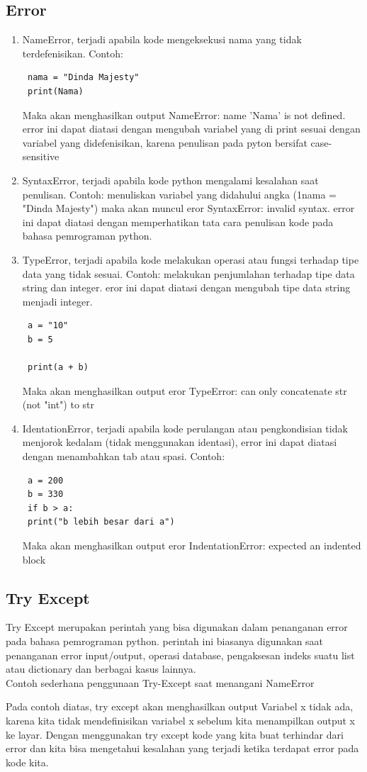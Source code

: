 \subsection{Error}
\begin{enumerate}
 \item NameError, terjadi apabila kode mengeksekusi nama yang tidak terdefenisikan. Contoh:
 \begin{verbatim}
 nama = "Dinda Majesty"
 print(Nama)
 \end{verbatim}
 Maka akan menghasilkan output NameError: name 'Nama' is not defined. error ini dapat diatasi dengan mengubah variabel yang di print sesuai dengan variabel yang didefenisikan, karena penulisan pada pyton bersifat case-sensitive
 
 \item SyntaxError, terjadi apabila kode python mengalami kesalahan saat penulisan. Contoh: menuliskan variabel yang didahului angka (1nama = "Dinda Majesty") maka akan muncul eror SyntaxError: invalid syntax. error ini dapat diatasi dengan memperhatikan tata cara penulisan kode pada bahasa pemrograman python.
 
 \item TypeError, terjadi apabila kode melakukan operasi atau fungsi terhadap tipe data yang tidak sesuai. Contoh: melakukan penjumlahan terhadap tipe data string dan integer. eror ini dapat diatasi dengan mengubah tipe data string menjadi integer.
 \begin{verbatim}
 a = "10"
 b = 5

 print(a + b)
 \end{verbatim}
 Maka akan menghasilkan output eror TypeError: can only concatenate str (not "int") to str
 
 \item IdentationError, terjadi apabila kode perulangan atau pengkondisian tidak menjorok kedalam (tidak menggunakan identasi), error ini dapat diatasi dengan menambahkan tab atau spasi. Contoh:
 \begin{verbatim}
 a = 200
 b = 330
 if b > a:
 print("b lebih besar dari a")
 \end{verbatim}
 Maka akan menghasilkan output eror IndentationError: expected an indented block
\end{enumerate}

\subsection{Try Except}
Try Except merupakan perintah yang bisa digunakan dalam penanganan error pada bahasa pemrograman python. perintah ini biasanya digunakan saat penanganan error input/output, operasi database, pengaksesan indeks suatu list atau dictionary dan berbagai kasus lainnya.\\
Contoh sederhana penggunaan Try-Except saat menangani NameError

Pada contoh diatas, try except akan menghasilkan output Variabel x tidak ada, karena kita tidak mendefinisikan variabel x sebelum kita menampilkan output x ke layar. Dengan menggunakan try except kode yang kita buat terhindar dari error dan kita bisa mengetahui kesalahan yang terjadi ketika terdapat error pada kode kita.


